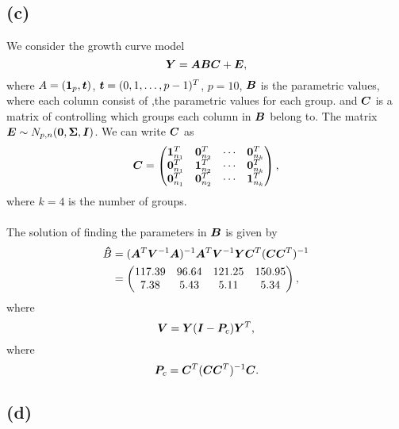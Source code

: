 \subsection*{(c)}
\label{sec:c-6}

We consider the growth curve model 
\begin{equation*}
  \bm{Y} = \bm{ABC} +  \bm{E},
\end{equation*}
where $A = (\bm{1}_{p},\bm{t})$, $\bm{t} = (0, 1, \dots, p - 1)^{T}$, $p =
10$,  $\bm{B}$ is
the parametric values, where each column 
consist of ,the parametric values for each group.  and $\bm{C}$ is a
matrix of controlling which groups each column in $\bm{B}$ belong to. The
matrix $\bm{E} \sim N_{p, n}(\bm{0}, \bm{\Sigma}, \bm{I})$. We can write $\bm{C}$ as
\begin{equation*}
  \bm{C} =
  \begin{pmatrix}
    \bm{1}_{n_{1}}^{T} & \bm{0}_{n_{2}}^{T} & \cdots & \bm{0}_{n_{k}}^{T} \\
    \bm{0}_{n_{1}}^{T} & \bm{1}_{n_{2}}^{T} & \cdots & \bm{0}_{n_{k}}^{T} \\
    \bm{0}_{n_{1}}^{T} & \bm{0}_{n_{2}}^{T} & \cdots & \bm{1}_{n_{k}}^{T}
  \end{pmatrix},
\end{equation*}
where $k = 4$ is the number of groups. \\
\\
The solution of finding the parameters in $\bm{B}$ is given by 
\begin{align*}
  \bm{\hat} B &= (\bm{A}^{T}\bm{V}^{-1}\bm{A})^{-1}  \bm{A}^{T}\bm{V}^{-1}\bm{Y}
              \bm{C}^{T}(\bm{C}\bm{C}^{T})^{-1}
  \\
  &=
  \begin{pmatrix}
    117.39 &96.64 &121.25 &150.95 \\ 
    7.38 &5.43 &5.11 &5.34
  \end{pmatrix},
\end{align*}
where
\begin{equation*}
  \bm{V} =  \bm{Y}  (\bm{I} - \bm{P}_{c})  \bm{Y}^{T},
\end{equation*}
where
\begin{equation*}
  \bm{P}_{c} = \bm{C}^{T}(\bm{C}\bm{C}^{T})^{-1}\bm{C}.
\end{equation*}

\subsection*{(d)}
\label{sec:d-2}

